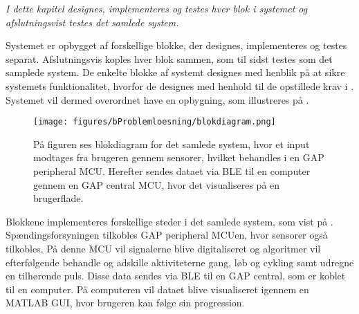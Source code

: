 \textit{I dette kapitel designes, implementeres og testes hver blok i systemet og afslutningsvist testes det samlede system.}

Systemet er opbygget af forskellige blokke, der designes, implementeres og testes separat. Afslutningsvis koples hver blok sammen, som til sidst testes som det samplede system. %
De enkelte blokke af systemt designes med henblik på at sikre systemets funktionalitet, hvorfor de designes med henhold til de opstillede krav i . Systemet vil dermed overordnet have en opbygning, som illustreres på .
\begin{figure}[H]
	\centering
	\texttt{[image: figures/bProblemloesning/blokdiagram.png]}
	\caption{På figuren ses blokdiagram for det samlede system, hvor et input modtages fra brugeren gennem sensorer, hvilket behandles i en GAP peripheral MCU. Herefter sendes dataet via BLE til en computer gennem en GAP central MCU, hvor det visualiseres på en brugerflade.}
	\label{fig:design_blokdiagram}
\end{figure}
Blokkene implementeres forskellige steder i det samlede system, som vist på . Spændingsforsyningen tilkobles GAP peripheral MCUen, hvor sensorer også tilkobles. På denne MCU vil signalerne blive digitaliseret og algoritmer vil efterfølgende behandle og adskille aktiviteterne gang, løb og cykling samt udregne en tilhørende puls. Disse data sendes via BLE til en GAP central, som er koblet til en computer. På computeren vil dataet blive visualiseret igennem en MATLAB GUI, hvor brugeren kan følge sin progression.